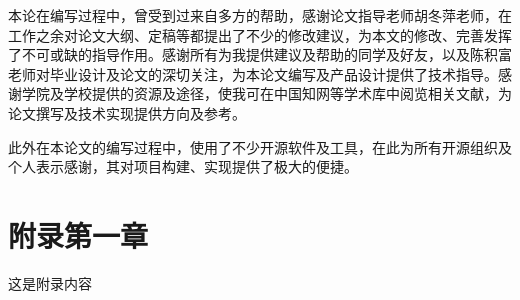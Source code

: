 \documentclass[oneside]{jufethesis}
\begin{document}
本论在编写过程中，曾受到过来自多方的帮助，感谢论文指导老师胡冬萍老师，在工作之余对论文大纲、定稿等都提出了不少的修改建议，为本文的修改、完善发挥了不可或缺的指导作用。感谢所有为我提供建议及帮助的同学及好友，以及陈积富老师对毕业设计及论文的深切关注，为本论文编写及产品设计提供了技术指导。感谢学院及学校提供的资源及途径，使我可在中国知网等学术库中阅览相关文献，为论文撰写及技术实现提供方向及参考。

此外在本论文的编写过程中，使用了不少开源软件及工具，在此为所有开源组织及个人表示感谢，其对项目构建、实现提供了极大的便捷。



\appendix

\section*{附录第一章}

这是附录内容



% 
\end{document}
